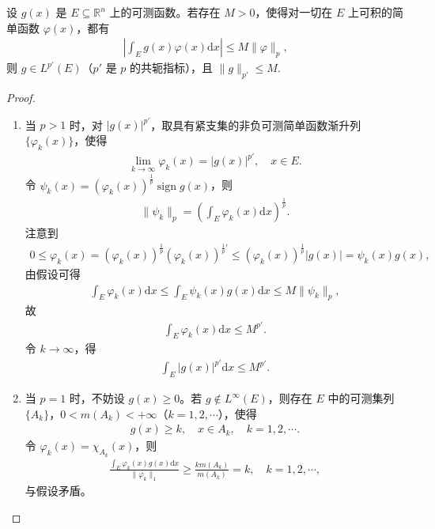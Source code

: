 \documentclass[../../main.tex]{subfiles}%
\begin{document}
\begin{theorem}\label{theorem:实变函数--定理6.19}
设 $g(x)$ 是 $E\subseteq\mathbb{R}^n$ 上的可测函数。若存在 $M>0$，使得对一切在 $E$ 上可积的简单函数 $\varphi(x)$，都有
\begin{align*}
\left| \int_E g(x)\varphi(x)\mathrm{d}x \right| \leqslant M \|\varphi\|_p,
\end{align*}
则 $g\in L^{p'}(E)$（$p'$ 是 $p$ 的共轭指标），且 $\|g\|_{p'}\leqslant M$.
\end{theorem}
\begin{proof}
\begin{enumerate}[(1)]
\item 当 $p>1$ 时，对 $|g(x)|^{p'}$，取具有紧支集的非负可测简单函数渐升列 $\{\varphi_k(x)\}$，使得
\begin{align*}
\lim_{k\to\infty} \varphi_k(x) = |g(x)|^{p'}, \quad x\in E.
\end{align*}
令 $\psi_k(x)=(\varphi_k(x))^{\frac{1}{p}} \operatorname{sign} g(x)$，则
\begin{align*}
\|\psi_k\|_p = \left( \int_E \varphi_k(x)\mathrm{d}x \right)^{\frac{1}{p}}.
\end{align*}
注意到
\begin{align*}
0 \leqslant \varphi_k(x) = (\varphi_k(x))^{\frac{1}{p}} (\varphi_k(x))^{\frac{1}{p}'} \leqslant (\varphi_k(x))^{\frac{1}{p}} |g(x)| = \psi_k(x)g(x),
\end{align*}
由假设可得
\begin{align*}
\int_E \varphi_k(x)\mathrm{d}x \leqslant \int_E \psi_k(x)g(x)\mathrm{d}x \leqslant M \|\psi_k\|_p,
\end{align*}
故
\begin{align*}
\int_E \varphi_k(x)\mathrm{d}x \leqslant M^{p'}.
\end{align*}
令 $k\to\infty$，得
\begin{align*}
\int_E |g(x)|^{p'} \mathrm{d}x \leqslant M^{p'}.
\end{align*}
\item 当 $p=1$ 时，不妨设 $g(x)\geqslant 0$。若 $g\notin L^\infty(E)$，则存在 $E$ 中的可测集列 $\{A_k\}$，$0<m(A_k)<+\infty$（$k=1,2,\cdots$），使得
\begin{align*}
g(x) \geqslant k, \quad x\in A_k, \quad k=1,2,\cdots.
\end{align*}
令 $\varphi_k(x)=\chi_{A_k}(x)$，则
\begin{align*}
\frac{\int_E \varphi_k(x)g(x)\mathrm{d}x}{\|\varphi_k\|_1} \geqslant \frac{k m(A_k)}{m(A_k)} = k, \quad k=1,2,\cdots,
\end{align*}
与假设矛盾。
\end{enumerate}
\end{proof}
\end{document}
